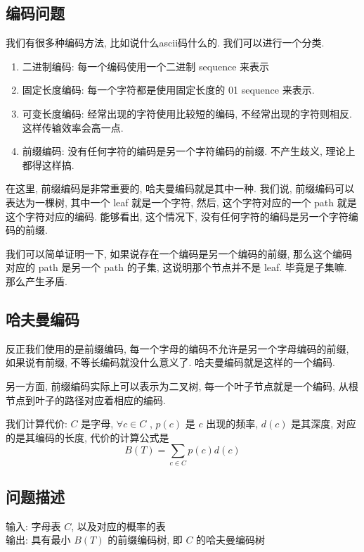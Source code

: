 \documentclass[a4paper, 10pt]{ctexart} %
\begin{document}
\subsection{编码问题}
我们有很多种编码方法, 比如说什么ascii码什么的. 我们可以进行一个分类. 
\begin{enumerate}
    \item 二进制编码: 每一个编码使用一个二进制 sequence 来表示
    \item 固定长度编码: 每一个字符都是使用固定长度的 01 sequence 来表示.
    \item 可变长度编码: 经常出现的字符使用比较短的编码, 不经常出现的字符则相反. 这样传输效率会高一点.
    \item 前缀编码: 没有任何字符的编码是另一个字符编码的前缀. 不产生歧义, 理论上都得这样搞.
\end{enumerate}

在这里, 前缀编码是非常重要的, 哈夫曼编码就是其中一种. 我们说, 前缀编码可以表达为一棵树, 
其中一个 leaf 就是一个字符, 然后, 这个字符对应的一个 path 就是这个字符对应的编码. 
能够看出, 这个情况下, 没有任何字符的编码是另一个字符编码的前缀. 

我们可以简单证明一下, 如果说存在一个编码是另一个编码的前缀, 
那么这个编码对应的 path 是另一个 
path 的子集, 这说明那个节点并不是 leaf. 
毕竟是子集嘛. 那么产生矛盾.
\subsection{哈夫曼编码}
反正我们使用的是前缀编码, 每一个字母的编码不允许是另一个字母编码的前缀,
如果说有前缀, 不等长编码就没什么意义了. 哈夫曼编码就是这样的一个编码.

另一方面, 前缀编码实际上可以表示为二叉树, 每一个叶子节点就是一个编码, 
从根节点到叶子的路径对应着相应的编码.

我们计算代价:
$C$ 是字母, $\forall  c\in C $ , $p\left(c\right)$ 是 $c$ 出现的频率,
$d (c)$ 是其深度, 对应的是其编码的长度, 
代价的计算公式是 
\[
B\left(T\right) =\sum_{ c\in C}p(c) d(c)
\]

\subsection{问题描述}
\noindent 输入: 字母表 $C$, 以及对应的概率的表\\
输出: 具有最小 $B\left(T\right)$ 的前缀编码树, 即 $C$ 的哈夫曼编码树
\end{document}

